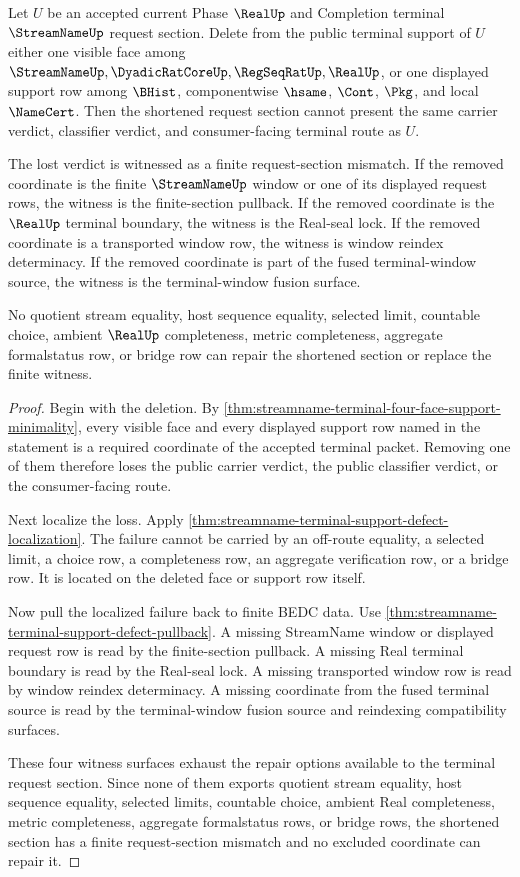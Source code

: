 \begin{theorem}
\label{thm:streamname-terminal-support-removal-witness}
Let $U$ be an accepted current Phase $\RealUp$ and Completion terminal
$\StreamNameUp$ request section. Delete from the public terminal support of
$U$ either one visible face among
$\StreamNameUp,\DyadicRatCoreUp,\RegSeqRatUp,\RealUp$, or one displayed support
row among $\BHist$, componentwise $\hsame$, $\Cont$, $\Pkg$, and local
$\NameCert$. Then the shortened request section cannot present the same
carrier verdict, classifier verdict, and consumer-facing terminal route as
$U$.

The lost verdict is witnessed as a finite request-section mismatch. If the
removed coordinate is the finite $\StreamNameUp$ window or one of its displayed
request rows, the witness is the finite-section pullback. If the removed
coordinate is the $\RealUp$ terminal boundary, the witness is the Real-seal
lock. If the removed coordinate is a transported window row, the witness is
window reindex determinacy. If the removed coordinate is part of the fused
terminal-window source, the witness is the terminal-window fusion surface.

No quotient stream equality, host sequence equality, selected limit, countable
choice, ambient $\RealUp$ completeness, metric completeness, aggregate
formalstatus row, or bridge row can repair the shortened section or replace the
finite witness.
\end{theorem}
\begin{proof}
Begin with the deletion. By
\autoref{thm:streamname-terminal-four-face-support-minimality}, every visible
face and every displayed support row named in the statement is a required
coordinate of the accepted terminal packet. Removing one of them therefore
loses the public carrier verdict, the public classifier verdict, or the
consumer-facing route.

Next localize the loss. Apply
\autoref{thm:streamname-terminal-support-defect-localization}. The failure
cannot be carried by an off-route equality, a selected limit, a choice row, a
completeness row, an aggregate verification row, or a bridge row. It is located
on the deleted face or support row itself.

Now pull the localized failure back to finite BEDC data. Use
\autoref{thm:streamname-terminal-support-defect-pullback}. A missing
StreamName window or displayed request row is read by the finite-section
pullback. A missing Real terminal boundary is read by the Real-seal lock. A
missing transported window row is read by window reindex determinacy. A missing
coordinate from the fused terminal source is read by the terminal-window fusion
source and reindexing compatibility surfaces.

These four witness surfaces exhaust the repair options available to the
terminal request section. Since none of them exports quotient stream equality,
host sequence equality, selected limits, countable choice, ambient Real
completeness, metric completeness, aggregate formalstatus rows, or bridge rows,
the shortened section has a finite request-section mismatch and no excluded
coordinate can repair it.
\end{proof}

